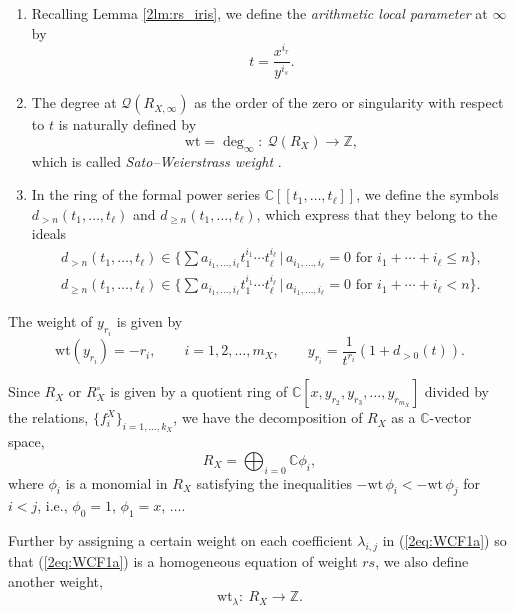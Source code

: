 \documentclass[10pt,a4paper]{amsart}
\def\CC{{\mathbb C}}
\def\ZZ{{\mathbb Z}}
\def\cQ{{\mathcal Q}}
\def\wt{{\mathrm {wt}}}
\numberwithin{equation}{section}
\begin{document}
\begin{Definition} \label{2df:wt_RX}\quad
\begin{enumerate}\itemsep=0pt
\item
Recalling Lemma \ref{2lm:rs_iris}, we define the \emph{arithmetic local parameter} at $\infty$ by \cite{Onishi18}
\[
t = \frac{x^{i_r}}{y^{i_s}}.
\]

\item The degree at $\cQ(R_{X,\infty})$ as the order of the zero or singularity with respect to $t$ is naturally defined by
\begin{equation*}
\wt=\deg_\infty\colon \ \cQ(R_X) \to \ZZ,%
\end{equation*}
which is called \emph{Sato--Weierstrass weight} \cite{Wei67}.

\item In the ring of the formal power series $\CC[[t_1, \dots, t_\ell]]$,
we define the symbols $d_{>n}(t_1, \dots, t_\ell)$ and $d_{\ge n}(t_1, \dots, t_\ell)$, which express that they belong to the ideals
\begin{gather*}
d_{>n}(t_1, \dots, t_\ell)\in \Big\{\sum a_{i_1,\dots, i_\ell} t_1^{i_1}
\cdots t_\ell^{i_\ell}\, |\,a_{i_1,\dots, i_\ell}=0
\text{ for } i_1+\cdots+i_\ell \leq n \Big\},
\\
d_{\ge n}(t_1, \dots, t_\ell)\in \Big\{\sum a_{i_1,\dots, i_\ell} t_1^{i_1} \cdots t_\ell^{i_\ell}\, |\,a_{i_1,\dots, i_\ell}=0
\text{ for }i_1+\cdots+i_\ell < n \Big\}.
\end{gather*}
\end{enumerate}
\end{Definition}

The weight of $y_{r_i}$ is given by
\[
\wt(y_{r_i}) = -r_i, \qquad i=1,2,\dots,{m_X},
\qquad
y_{r_i}=\frac{1}{t^{r_i}}(1+d_{>0}(t)).
\]

Since $R_X$ or $R_X^\circ$ is given by a quotient ring of $\CC[x,y_{r_2},y_{r_3},\dots, y_{r_{m_X}}]$ divided by the relations, $\big\{f_i^X\big\}_{i=1, \dots, k_X}$, we have the decomposition of $R_X$ as a $\CC$-vector space,
\begin{equation}
R_X = \bigoplus_{i=0} \CC \phi_i,\label{2eq:RXphi}
\end{equation}
where $\phi_i$ is a monomial in $R_X$ satisfying the inequalities $-\wt\,\phi_i < -\wt\,\phi_j$ for $i<j$, i.e., $\phi_0 = 1$, $\phi_1 = x$, $\dots$.

Further by assigning a certain weight on each coefficient $\lambda_{i,j}$ in (\ref{2eq:WCF1a}) so that (\ref{2eq:WCF1a}) is a homogeneous equation of weight $rs$, we also define another weight,
\begin{equation*}
\wt_\lambda\colon \ R_X \to \ZZ.%
\end{equation*}
\end{document}
